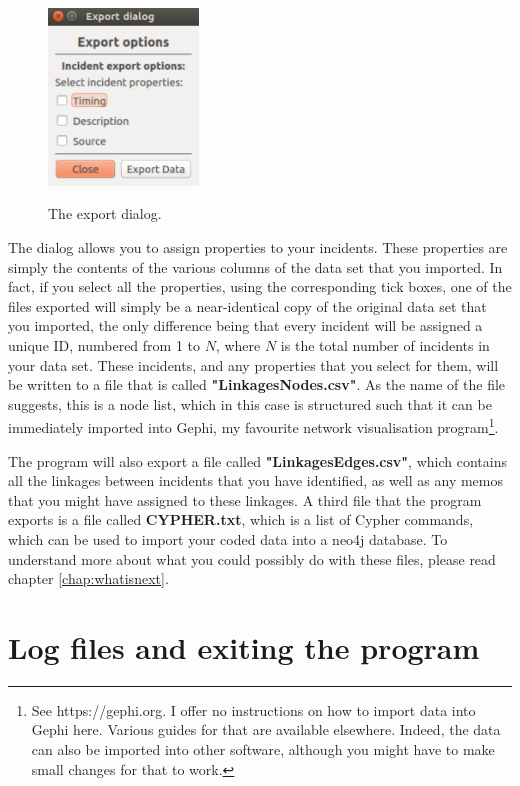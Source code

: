 \documentclass{memoir}
\begin{document}
\begin{figure}[h!]
  \centering
  \caption{The export dialog.}
  \includegraphics[width=40mm]{Screenshot_12.pdf}
  \label{fig:exportdialog}
\end{figure}

The dialog allows you to assign properties to your incidents. These properties are simply the contents of the various columns of the data set that you imported. In fact, if you select all the properties, using the corresponding tick boxes, one of the files exported will simply be a near-identical copy of the original data set that you imported, the only difference being that every incident will be assigned a unique ID, numbered from 1 to \(N\), where \(N\) is the total number of incidents in your data set. These incidents, and any properties that you select for them, will be written to a file that is called \textbf{"Linkages\textunderscore Nodes.csv"}. As the name of the file suggests, this is a node list, which in this case is structured such that it can be immediately imported into Gephi, my favourite network visualisation program\footnote{See https://gephi.org. I offer no instructions on how to import data into Gephi here. Various guides for that are available elsewhere. Indeed, the data can also be imported into other software, although you might have to make small changes for that to work.}. 

The program will also export a file called \textbf{"Linkages\textunderscore Edges.csv"}, which contains all the linkages between incidents that you have identified, as well as any memos that you might have assigned to these linkages. A third file that the program exports is a file called \textbf{CYPHER.txt}, which is a list of Cypher commands, which can be used to import your coded data into a neo4j database. To understand more about what you could possibly do with these files, please read chapter \ref{chap:whatisnext}.

\section{Log files and exiting the program}
\label{sec:logfilesandexiting}
\end{document}
